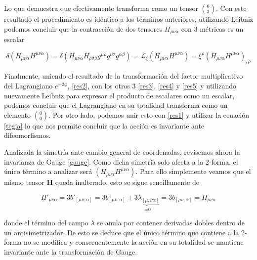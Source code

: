 \documentclass{article}
\numberwithin{equation}{section}
\begin{document}
Lo que demuestra que efectivamente transforma como un tensor $ \binom{0}{3} $. Con este resultado el procedimiento es idéntico a los términos anteriores, utilizando Leibniz podemos concluir que la contracción de dos tensores $ H_{\mu \nu \alpha} $ con 3 métricas es un escalar
\begin{boxquation}
\begin{equation}\label{res5}
\delta  \left(H_{\mu\nu\alpha}  H^{\mu\nu\alpha}\right) = \delta \left(H_{\mu\nu\alpha}  H_{\rho\sigma\beta} g^{\mu \rho} g^{\nu \sigma}g^{\alpha \beta}\right) = \mathcal{L}_{\xi} \left( H_{\mu\nu\alpha}  H^{\mu\nu\alpha} \right) = \xi^{\rho} \left( H_{\mu\nu\alpha}  H^{\mu\nu\alpha} \right)_{,\rho}
\end{equation}
\end{boxquation}

\vspace{0.4cm}

Finalmente, uniendo el resultado de la transformación del factor multiplicativo del Lagrangiano $ e^{-2\phi} $, \ref{res2},  con los otros 3 \ref{res3},  \ref{res4}  y  \ref{res5}  y utilizando nuevamente Leibniz para expresar el producto de escalares como un escalar, podemos concluir que el Lagrangiano en su totalidad transforma como un elemento $ \binom{0}{0} $. Por otro lado, podemos unir esto con \ref{res1} y utilizar la ecuación  \ref{tegia} lo que nos permite concluir que la acción es invariante ante difeomorfismos.\\

\vspace{0.4cm}

Analizada la simetría ante cambio general de coordenadas, revisemos ahora la invarianza de Gauge \ref{gauge}. Como dicha simetría solo afecta a la 2-forma, el único término a analizar será $ \left(H_{\mu\nu\alpha}  H^{\mu\nu\alpha}\right)  $. Para ello simplemente veamos que el mismo tensor $\textbf{H} $ queda inalterado, esto se sigue sencillamente de

\begin{equation*}
H'_{\mu\nu\alpha} = 3 b'_{\left[ \mu \nu , \alpha\right]} = 3 b_{\left[ \mu \nu , \alpha\right]}+ \underbrace{3\lambda_{\left[ \mu ,\nu \alpha\right]}}_{\text{ =0}} = 3 b_{\left[ \mu \nu , \alpha\right]} = H_{\mu\nu\alpha}
\end{equation*}

donde el término del campo $ \lambda $ se anula por contener derivadas dobles dentro de un antisimetrizador. De esto se deduce que el único término que contiene a la 2-forma no se modifica y consecuentemente la acción en su totalidad se mantiene invariante ante la transformación de Gauge.
\end{document}
